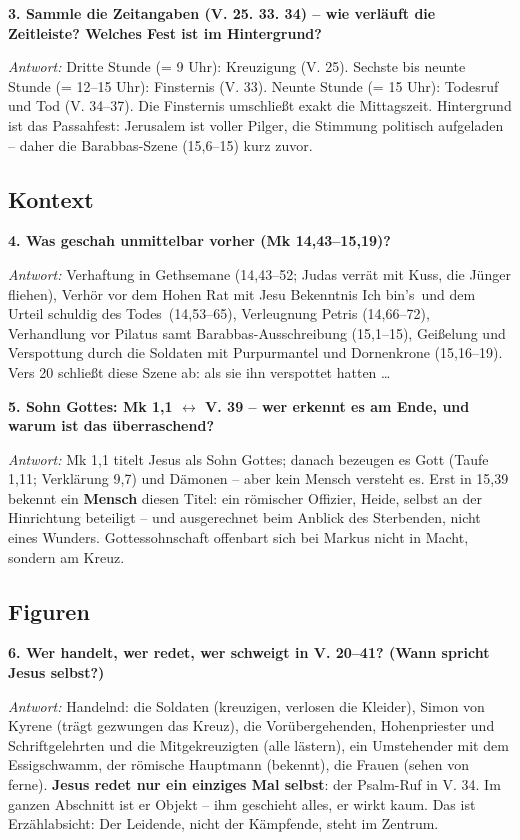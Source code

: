 \documentclass[12pt,a4paper]{article}
\newcommand{\frage}[1]{\par\vspace{0.7em}\noindent\textbf{#1}\par}
\newcommand{\antwort}[1]{\par\noindent\textit{Antwort:} #1\par}
\begin{document}
\frage{3. Sammle die Zeitangaben (V. 25. 33. 34) -- wie verläuft die Zeitleiste? Welches Fest ist im Hintergrund?}
\antwort{Dritte Stunde (= 9 Uhr): Kreuzigung (V. 25). Sechste bis neunte Stunde (= 12--15 Uhr): Finsternis (V. 33). Neunte Stunde (= 15 Uhr): Todesruf und Tod (V. 34--37). Die Finsternis umschließt exakt die Mittagszeit. Hintergrund ist das Passahfest: Jerusalem ist voller Pilger, die Stimmung politisch aufgeladen -- daher die Barabbas-Szene (15,6--15) kurz zuvor.}

\subsection*{Kontext}

\frage{4. Was geschah unmittelbar vorher (Mk 14,43--15,19)?}
\antwort{Verhaftung in Gethsemane (14,43--52; Judas verrät mit Kuss, die Jünger fliehen), Verhör vor dem Hohen Rat mit Jesu Bekenntnis \glqq Ich bin's\grqq\ und dem Urteil \glqq schuldig des Todes\grqq\ (14,53--65), Verleugnung Petris (14,66--72), Verhandlung vor Pilatus samt Barabbas-Ausschreibung (15,1--15), Geißelung und Verspottung durch die Soldaten mit Purpurmantel und Dornenkrone (15,16--19). Vers 20 schließt diese Szene ab: \glqq als sie ihn verspottet hatten \ldots\grqq\ }

\frage{5. \glqq Sohn Gottes\grqq{}: Mk 1,1 $\leftrightarrow$ V. 39 -- wer erkennt es am Ende, und warum ist das überraschend?}
\antwort{Mk 1,1 titelt Jesus als \glqq Sohn Gottes\grqq{}; danach bezeugen es Gott (Taufe 1,11; Verklärung 9,7) und Dämonen -- aber kein Mensch versteht es. Erst in 15,39 bekennt ein \textbf{Mensch} diesen Titel: ein römischer Offizier, Heide, selbst an der Hinrichtung beteiligt -- und ausgerechnet beim Anblick des Sterbenden, nicht eines Wunders. Gottessohnschaft offenbart sich bei Markus nicht in Macht, sondern am Kreuz.}

\subsection*{Figuren}

\frage{6. Wer handelt, wer redet, wer schweigt in V. 20--41? (Wann spricht Jesus selbst?)}
\antwort{Handelnd: die Soldaten (kreuzigen, verlosen die Kleider), Simon von Kyrene (trägt gezwungen das Kreuz), die Vorübergehenden, Hohenpriester und Schriftgelehrten und die Mitgekreuzigten (alle lästern), ein Umstehender mit dem Essigschwamm, der römische Hauptmann (bekennt), die Frauen (sehen von ferne). \textbf{Jesus redet nur ein einziges Mal selbst}: der Psalm-Ruf in V. 34. Im ganzen Abschnitt ist er Objekt -- ihm geschieht alles, er wirkt kaum. Das ist Erzählabsicht: Der Leidende, nicht der Kämpfende, steht im Zentrum.}
\end{document}
